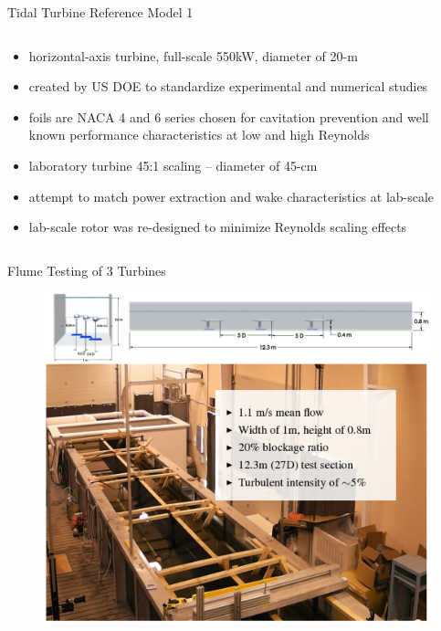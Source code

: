 \documentclass[xcolor=x11names,compress]{beamer}
\renewcommand{\(}{\begin{columns}}
\renewcommand{\)}{\end{columns}}
\newcommand{\<}[1]{\begin{column}{#1}}
\renewcommand{\>}{\end{column}}
\begin{document}
\begin{frame}{Tidal Turbine Reference Model 1}
\begin{columns}
\begin{column}{0.55\textwidth}
				\begin{itemize}
					\item \footnotesize horizontal-axis turbine, full-scale 550kW, diameter of 20-m
					\item created by US DOE to standardize experimental and numerical studies
					\item foils are NACA 4 and 6 series chosen for cavitation prevention and well known performance characteristics at low and high Reynolds
					\item laboratory turbine 45:1 scaling -- diameter of 45-cm
					\item attempt to match power extraction and wake characteristics at lab-scale
					\item lab-scale rotor was re-designed to minimize Reynolds scaling effects
				\end{itemize}
		    
		    \end{column}

		\end{columns}

	\end{frame}



	\begin{frame}{Flume Testing of 3 Turbines}

		\begin{figure}[p]
		    \centering
		    \includegraphics[width=1.0\textwidth]{figures/flume_and_description_v2.png}
		    \label{fig:turbines in flume}
		\end{figure}


	\end{frame}
\end{document}
